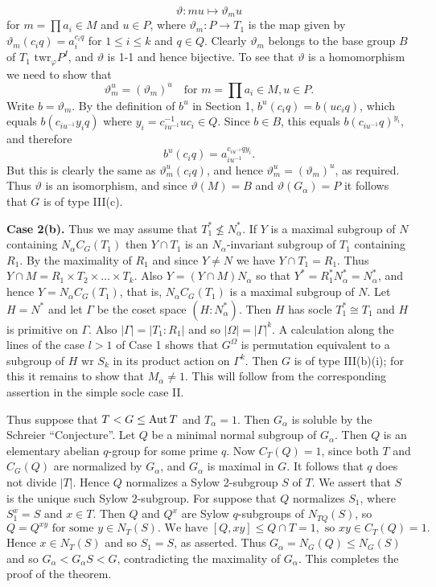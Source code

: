 $$ \vartheta: mu \mapsto \vartheta_m u $$
for $m = \prod a_i \in M$ and $u \in P$, where $\vartheta_m: P \to T_1$ is the map given by $\vartheta_m(c_i q) = a_i^{c_i q}$ for $1 \le i \le k$ and $q \in Q$. Clearly $\vartheta_m$ belongs to the base group $B$ of $T_1 \text{ twr}_\varphi P^I$, and $\vartheta$ is 1-1 and hence bijective. To see that $\vartheta$ is a homomorphism we need to show that
$$ \vartheta_m^u = (\vartheta_m)^u \quad \text{for } m=\prod a_i \in M, u \in P. $$
Write $b = \vartheta_m$. By the definition of $b^u$ in Section 1, $b^u(c_i q) = b(uc_i q)$, which equals $b(c_{iu^{-1}} y_i q)$ where $y_i = c_{iu^{-1}}^{-1} uc_i \in Q$. Since $b \in B$, this equals $b(c_{iu^{-1}} q)^{y_i}$, and therefore
$$ b^u(c_i q) = a_{iu^{-1}}^{c_{iu^{-1}} q y_i}. $$
But this is clearly the same as $\vartheta_m^u(c_i q)$, and hence $\vartheta_m^u = (\vartheta_m)^u$, as required.
Thus $\vartheta$ is an isomorphism, and since $\vartheta(M) = B$ and $\vartheta(G_\alpha) = P$ it follows that $G$ is of type III(c).


\textbf{Case 2(b).} Thus we may assume that $T_1^* \not\le N_\alpha^*$. If $Y$ is a maximal subgroup of $N$ containing $N_\alpha C_G(T_1)$ then $Y \cap T_1$ is an $N_\alpha$-invariant subgroup of $T_1$ containing $R_1$. By the maximality of $R_1$ and since $Y \ne N$ we have $Y \cap T_1 = R_1$. Thus $Y \cap M = R_1 \times T_2 \times \dots \times T_k$. Also $Y = (Y \cap M)N_\alpha$ so that $Y^* = R_1^* N_\alpha^* = N_\alpha^*$, and hence $Y = N_\alpha C_G(T_1)$, that is, $N_\alpha C_G(T_1)$ is a maximal subgroup of $N$. Let $H=N^*$ and let $\Gamma$ be the coset space $(H:N_\alpha^*)$. Then $H$ has socle $T_1^* \cong T_1$ and $H$ is primitive on $\Gamma$. Also $|\Gamma| = |T_1:R_1|$ and so $|\Omega|=|\Gamma|^k$. A calculation along the lines of the case $l>1$ of Case 1 shows that $G^\Omega$ is permutation equivalent to a subgroup of $H \text{ wr } S_k$ in its product action on $\Gamma^k$. Then $G$ is of type III(b)(i); for this it remains to show that $M_\alpha \ne 1$. This will follow from the corresponding assertion in the simple socle case II.

Thus suppose that $T < G \le \operatorname{Aut} T$ and $T_\alpha = 1$. Then $G_\alpha$ is soluble by the Schreier ``Conjecture''. Let $Q$ be a minimal normal subgroup of $G_\alpha$. Then $Q$ is an elementary abelian $q$-group for some prime $q$. Now $C_T(Q)=1$, since both $T$ and $C_G(Q)$ are normalized by $G_\alpha$, and $G_\alpha$ is maximal in $G$. It follows that $q$ does not divide $|T|$. Hence $Q$ normalizes a Sylow 2-subgroup $S$ of $T$. We assert that $S$ is the unique such Sylow 2-subgroup. For suppose that $Q$ normalizes $S_1$, where $S_1^x=S$ and $x \in T$. Then $Q$ and $Q^x$ are Sylow $q$-subgroups of $N_{TQ}(S)$, so
$$Q=Q^{xy} \text{ for some } y \in N_T(S). \text{ We have } [Q,xy] \le Q \cap T = 1, \text{ so } xy \in C_T(Q)=1. $$
Hence $x \in N_T(S)$ and so $S_1=S$, as asserted. Thus $G_\alpha = N_G(Q) \le N_G(S)$ and so $G_\alpha < G_\alpha S < G$, contradicting the maximality of $G_\alpha$.
This completes the proof of the theorem.

